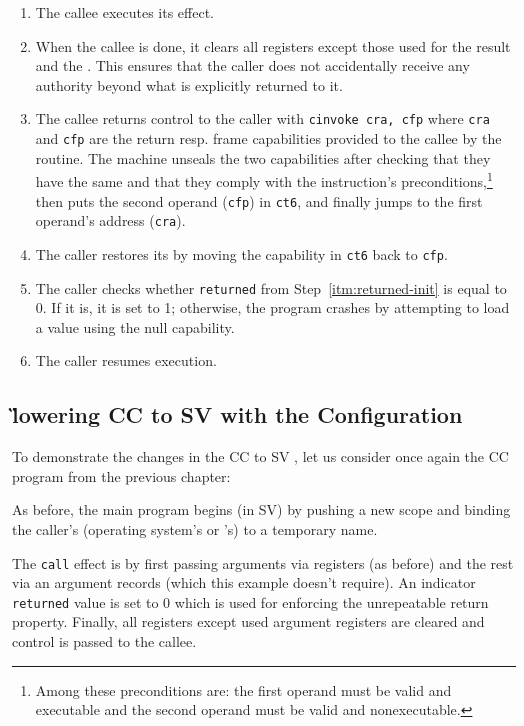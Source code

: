 \documentclass[main.tex]{subfiles}
\begin{document}
\begin{enumerate}
	\item The callee executes its effect.
	
	\item When the callee is done, it clears all registers except those used for the result and the . This ensures that the caller does not accidentally receive any authority beyond what is explicitly returned to it.
	
	\item The callee returns control to the caller with \hbox{\texttt{cinvoke cra, cfp}} where \texttt{cra} and \texttt{cfp} are the return resp. frame capabilities provided to the callee by the  routine. The machine unseals the two capabilities after checking that they have the same  and that they comply with the instruction's preconditions,\footnote{Among these preconditions are: the first operand must be valid and executable and the second operand must be valid and nonexecutable.} then puts the second operand (\texttt{cfp}) in \texttt{ct6}, and finally jumps to the first operand's address (\texttt{cra}).
	
	\item The caller restores its  by moving the capability in \texttt{ct6} back to \texttt{cfp}.
	
	\item The caller checks whether \texttt{returned} from Step~\ref{itm:returned-init} is equal to 0. If it is, it is set to 1; otherwise, the program crashes by attempting to load a value using the null capability.
	
	\item The caller resumes execution.
	
\end{enumerate}

\subsection{\G{lowering} CC to SV with the  Configuration}
To demonstrate the changes in the CC to SV , let us consider once again the CC program from the previous chapter:

As before, the main program begins (in SV) by pushing a new scope and binding the caller's (operating system's or 's)  to a temporary name.

The \texttt{call} effect is \lowered{} by first passing arguments via registers (as before) and the rest via an argument records (which this example doesn't require). An indicator \texttt{returned} value is set to 0 which is used for enforcing the unrepeatable return property. Finally, all registers except used argument registers are cleared and control is passed to the callee.
\end{document}
